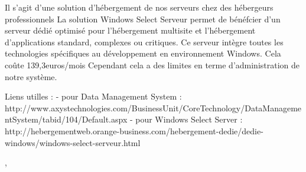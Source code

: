 \documentclass{article}
\begin{document}
{Il s'agit d'une solution d'hébergement de nos serveurs chez des hébergeurs professionnels}
{La solution Windows Select Serveur permet de bénéfcier d’un serveur dédié optimisé pour l’hébergement multisite et l’hébergement d’applications standard, complexes ou critiques. Ce serveur intègre toutes les technologies spécifiques au développement en environnement Windows.}
{}
{Cela coûte 139,3euros/mois}
{}
{Cependant cela a des limites en terme d'administration de notre système.}


Liens utilles : 
- pour Data Management System : http://www.axystechnologies.com/BusinessUnit/CoreTechnology/DataManagementSystem/tabid/104/Default.aspx
- pour Windows Select Server : http://hebergementweb.orange-business.com/hebergement-dedie/dedie-windows/windows-select-serveur.html

,
\end{document}
